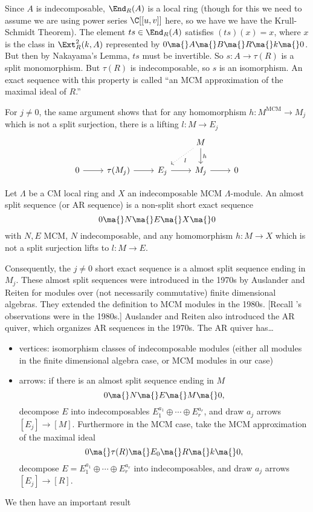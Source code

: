 Since $A$ is indecomposable, $\End_R(A)$ is a local ring (though for this we need to assume we are using power series $\C[[u,v]]$ here, so we have we have the Krull-Schmidt Theorem). The element $ts \in \End_R(A)$ satisfies $(ts)(x)= x$, where $x$ is the class in $\Ext_R^2(k,A)$ represented by $0 \ma{} A \ma{} B \ma{} R \ma{} k \ma{} 0$. But then by Nakayama's Lemma, $ts$ must be invertible. So $s: A \to \tau(R)$ is a split monomorphism. But $\tau(R)$ is indecomposable, so $s$ is an isomorphism. An exact sequence with this property is called ``an MCM approximation of the maximal ideal of $R$.'' 


For $j \neq 0$, the same argument shows that for any homomorphism $h: M^\text{MCM} \to M_j$ which is not a split surjection, there is a lifting $l: M \to E_j$
	\[
	\begin{tikzcd}
	& & & M \arrow[dotted]{dl}{l} \arrow{d}{h} & \\
	0 \arrow{r} & \tau(M_j) \arrow{r} & E_j \arrow{r} & M_j  \arrow{r} & 0  
	\end{tikzcd}
	\]


\begin{dfn}
Let $\Lambda$ be a CM local ring and $X$ an indecomposable MCM $\Lambda$-module. An almost split sequence (or AR sequence) is a non-split short exact sequence
	\[
	0 \ma{} N \ma{} E \ma{} X \ma{} 0
	\]
with $N,E$ MCM, $N$ indecomposable, and any homomorphism $h: M \to X$ which is not a split surjection lifts to $l: M \to E$. 
\end{dfn}


Consequently, the $j \neq 0$ short exact sequence is a almost split sequence ending in $M_j$. These almost split sequences were introduced in the 1970s by Auslander and Reiten for modules over (not necessarily commutative) finite dimensional algebras. They extended the definition to MCM modules in the 1980s. [Recall \mc's observations were in the 1980s.] Auslander and Reiten also introduced the AR quiver, which organizes AR sequences in the 1970s. The AR quiver has\dots
	\begin{itemize}
	\item vertices: isomorphism classes of indecomposable modules (either all modules in the finite dimensional algebra case, or MCM modules in our case)
	\item arrows: if there is an almost split sequence ending in $M$
	\[
	0 \ma{} N \ma{} E \ma{} M \ma{} 0,
	\]
decompose $E$ into indecomposables $E_1^{a_1} \oplus \cdots \oplus E_r^{a_r}$, and draw $a_j$ arrows $[E_j] \to [M]$. Furthermore in the MCM case, take the MCM approximation of the maximal ideal
	\[
	0 \ma{} \tau(R) \ma{} E_0 \ma{} R \ma{} k \ma{} 0,
	\]
decompose $E= E_1^{a_1} \oplus \cdots \oplus E_r^{a_r}$ into indecomposables, and draw $a_j$ arrows $[E_j] \to [R]$. 
	\end{itemize}
We then have an important result

